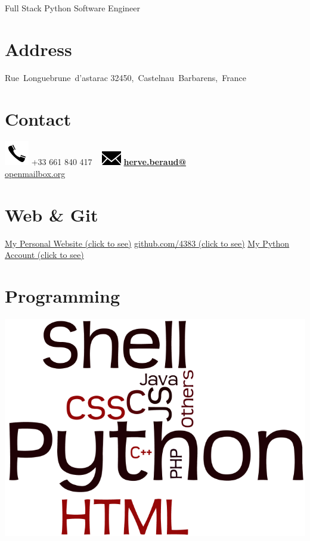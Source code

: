\documentclass[]{friggeri-cv}
\begin{document}
    {Full Stack Python Software Engineer}
      

\begin{aside}
  \section{Address}
    Rue~Longuebrune~d'astarac
    32450,~Castelnau~Barbarens,~France
    ~
  \section{Contact}
    \includegraphics[scale=0.50]{img/phone.png}
    +33 661 840 417
    ~
    \includegraphics[scale=0.50]{img/mail.png}
    \href{mailto:herve.beraud@openmailbox.org}{\textbf{herve.beraud@}\\openmailbox.org}
    ~
  \section{Web \& Git}
    \href{http://www.herve-beraud.ovh}{My Personal Website (click to see)}
    \href{https://github.com/4383}{github.com/4383 (click to see)}
    \href{https://warehouse.python.org/user/4383/}{My Python Account (click to see)}
    ~
  \section{Programming}
    \includegraphics[scale=0.15]{img/programming.png}
    ~

\end{aside}
\end{document}

